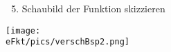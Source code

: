 \begin{minipage}{\textwidth}
	\begin{minipage}{0.49\textwidth}
		\begin{enumerate}[label=\arabic*), leftmargin=*, rightmargin=0.5cm]
			\setcounter{enumi}{4}
			\item Schaubild der Funktion skizzieren
		\end{enumerate}
	\end{minipage}
	\begin{minipage}{0.49\textwidth}
		\begin{minipage}[t]{0.95\textwidth}
			\texttt{[image: \\eFkt/pics/verschBsp2.png]}
		\end{minipage}
	\end{minipage}
\end{minipage}
\newpage
